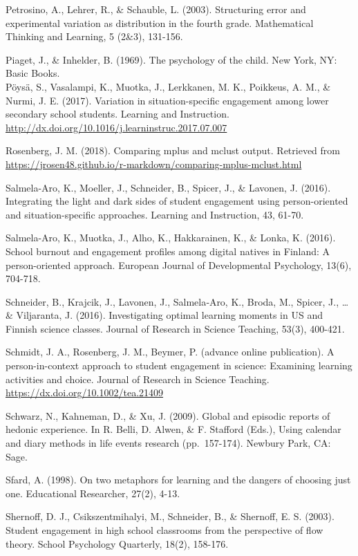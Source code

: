 \documentclass[]{book}
\theoremstyle{definition}
\theoremstyle{definition}
\theoremstyle{definition}
\theoremstyle{remark}
\begin{document}
Petrosino, A., Lehrer, R., \& Schauble, L. (2003). Structuring error and
experimental variation as distribution in the fourth grade. Mathematical
Thinking and Learning, 5 (2\&3), 131-156.

Piaget, J., \& Inhelder, B. (1969). The psychology of the child. New
York, NY: Basic Books.\\
Pöysä, S., Vasalampi, K., Muotka, J., Lerkkanen, M. K., Poikkeus, A. M.,
\& Nurmi, J. E. (2017). Variation in situation-specific engagement among
lower secondary school students. Learning and Instruction.
\url{http://dx.doi.org/10.1016/j.learninstruc.2017.07.007}

Rosenberg, J. M. (2018). Comparing mplus and mclust output. Retrieved
from
\url{https://jrosen48.github.io/r-markdown/comparing-mplus-mclust.html}

Salmela-Aro, K., Moeller, J., Schneider, B., Spicer, J., \& Lavonen, J.
(2016). Integrating the light and dark sides of student engagement using
person-oriented and situation-specific approaches. Learning and
Instruction, 43, 61-70.

Salmela-Aro, K., Muotka, J., Alho, K., Hakkarainen, K., \& Lonka, K.
(2016). School burnout and engagement profiles among digital natives in
Finland: A person-oriented approach. European Journal of Developmental
Psychology, 13(6), 704-718.

Schneider, B., Krajcik, J., Lavonen, J., Salmela‐Aro, K., Broda, M.,
Spicer, J., \ldots{} \& Viljaranta, J. (2016). Investigating optimal
learning moments in US and Finnish science classes. Journal of Research
in Science Teaching, 53(3), 400-421.

Schmidt, J. A., Rosenberg, J. M., Beymer, P. (advance online
publication). A person-in-context approach to student engagement in
science: Examining learning activities and choice. Journal of Research
in Science Teaching. \url{https://dx.doi.org/10.1002/tea.21409}

Schwarz, N., Kahneman, D., \& Xu, J. (2009). Global and episodic reports
of hedonic experience. In R. Belli, D. Alwen, \& F. Stafford (Eds.),
Using calendar and diary methods in life events research (pp.~157-174).
Newbury Park, CA: Sage.

Sfard, A. (1998). On two metaphors for learning and the dangers of
choosing just one. Educational Researcher, 27(2), 4-13.

Shernoff, D. J., Csikszentmihalyi, M., Schneider, B., \& Shernoff, E. S.
(2003). Student engagement in high school classrooms from the
perspective of flow theory. School Psychology Quarterly, 18(2), 158-176.
\end{document}
